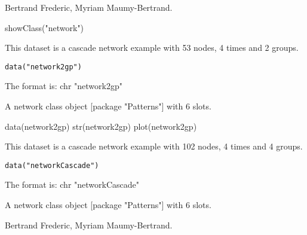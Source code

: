 \documentclass[a4paper]{book}
\begin{document}
%
\begin{Author}\relax
Bertrand Frederic, Myriam Maumy-Bertrand.
\end{Author}
%
\begin{Examples}
\begin{ExampleCode}
showClass("network")
\end{ExampleCode}
\end{Examples}
%
\begin{Description}\relax
This dataset is a cascade network example with 53 nodes, 4 times and 2 groups.
\end{Description}
%
\begin{Usage}
\begin{verbatim}
data("network2gp")
\end{verbatim}
\end{Usage}
%
\begin{Format}
The format is:
chr "network2gp"
\end{Format}
%
\begin{Details}\relax
A network class object [package "Patterns"] with 6 slots.
\end{Details}
%
\begin{Examples}
\begin{ExampleCode}
data(network2gp)
str(network2gp)
plot(network2gp)
\end{ExampleCode}
\end{Examples}
%
\begin{Description}\relax
This dataset is a cascade network example with 102 nodes, 4 times and 4 groups.
\end{Description}
%
\begin{Usage}
\begin{verbatim}
data("networkCascade")
\end{verbatim}
\end{Usage}
%
\begin{Format}
The format is:
chr "networkCascade"
\end{Format}
%
\begin{Details}\relax
A network class object [package "Patterns"] with 6 slots.
\end{Details}
%
\begin{Author}\relax
Bertrand Frederic, Myriam Maumy-Bertrand.
\end{Author}
\end{document}
